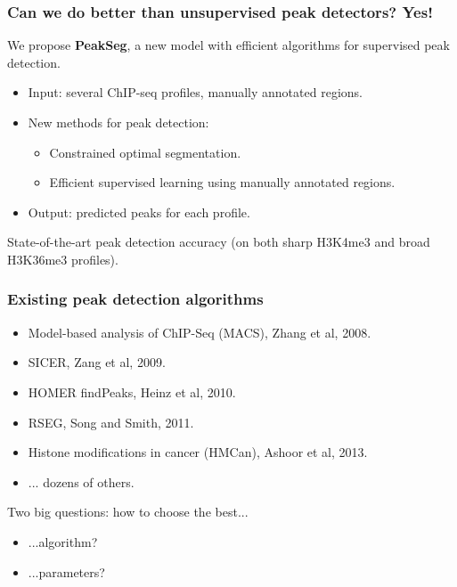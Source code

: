 \documentclass{beamer}
\begin{document}
\begin{frame}
  \frametitle{Can we do better than unsupervised peak detectors? Yes!}
  We propose \textbf{PeakSeg}, a new model with efficient algorithms
  for supervised peak detection.
  \begin{itemize}
  \item Input: \alert<1>{several ChIP-seq profiles},
    \alert<2>{manually annotated regions}.
  \item New methods for peak detection: 
    \begin{itemize}
    \item \alert<1>{Constrained optimal segmentation}.
    \item Efficient \alert<2>{supervised learning using manually annotated
      regions}.
    \end{itemize}
  \item Output: predicted peaks for each profile.
  \end{itemize}
  State-of-the-art peak detection accuracy (on both sharp H3K4me3 and
  broad H3K36me3 profiles).
\end{frame}

\begin{frame}
  \frametitle{Existing peak detection algorithms}
  \begin{itemize}
  \item Model-based analysis of ChIP-Seq (MACS), Zhang et al, 2008.
  \item SICER, Zang et al, 2009.
  \item HOMER findPeaks, Heinz et al, 2010.
  \item RSEG, Song and Smith, 2011.
  \item Histone modifications in cancer (HMCan), Ashoor et al, 2013.
  \item ... dozens of others.
  \end{itemize}
  Two big questions: how to choose the best...
  \begin{itemize}
  \item ...algorithm?
  \item ...parameters?
  \end{itemize}
\end{frame}
\end{document}
